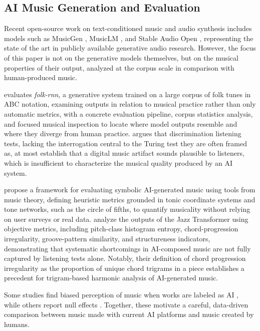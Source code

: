 \documentclass{article}
\begin{document}
\subsection{AI Music Generation and Evaluation}
Recent open-source work on text-conditioned music and audio synthesis includes models such as MusicGen \citep{copet2023simple}, MusicLM \citep{agostinelli2023musiclm}, and Stable Audio Open \citep{evans2025stable}, representing the state of the art in publicly available generative audio research. However, the focus of this paper is not on the generative models themselves, but on the musical properties of their output, analyzed at the corpus scale in comparison with human-produced music.

\citet{Sturm2016c} evaluates \textit{folk-rnn}, a generative system trained on a large corpus of folk tunes in ABC notation, examining outputs in relation to musical practice rather than only automatic metrics, with a concrete evaluation pipeline, corpus statistics analysis, and focused musical inspection to locate where model outputs resemble and where they diverge from human practice. \citet{Ariza2009a} argues that discrimination listening tests, lacking the interrogation central to the Turing test they are often framed as, at most establish that a digital music artifact sounds plausible to listeners, which is insufficient to characterize the musical quality produced by an AI system.

\citet{dervakos2021heuristics} propose a framework for evaluating symbolic AI-generated music using tools from music theory, defining heuristic metrics grounded in tonic coordinate systems and tone networks, such as the circle of fifths, to quantify musicality without relying on user surveys or real data. \citet{wu2020jazz} analyze the outputs of the Jazz Transformer using objective metrics, including pitch-class histogram entropy, chord-progression irregularity, groove-pattern similarity, and structureness indicators, demonstrating that systematic shortcomings in AI-composed music are not fully captured by listening tests alone. Notably, their definition of chord progression irregularity as the proportion of unique chord trigrams in a piece establishes a precedent for trigram-based harmonic analysis of AI-generated music.

Some studies find biased perception of music when works are labeled as AI \citep{Ragot2020t,Shank2022q,Deguernel2023a}, while others report null effects \citep{Pasquier2016a,Zlatkov2023a}. Together, these motivate a careful, data-driven comparison between music made with current AI platforms and music created by humans.
\end{document}
